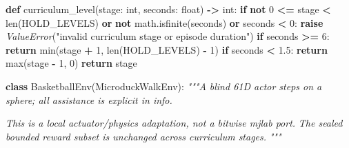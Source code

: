 \documentclass[
  american,
  11pt,
  letterpaper,
]{article}
\newenvironment{Shaded}{\begin{snugshade}}{\end{snugshade}}
\newcommand{\BuiltInTok}[1]{#1}
\newcommand{\CommentTok}[1]{\textcolor[rgb]{0.56,0.35,0.01}{\textit{#1}}}
\newcommand{\ControlFlowTok}[1]{\textcolor[rgb]{0.13,0.29,0.53}{\textbf{#1}}}
\newcommand{\DecValTok}[1]{\textcolor[rgb]{0.00,0.00,0.81}{#1}}
\newcommand{\FloatTok}[1]{\textcolor[rgb]{0.00,0.00,0.81}{#1}}
\newcommand{\KeywordTok}[1]{\textcolor[rgb]{0.13,0.29,0.53}{\textbf{#1}}}
\newcommand{\NormalTok}[1]{#1}
\newcommand{\OperatorTok}[1]{\textcolor[rgb]{0.81,0.36,0.00}{\textbf{#1}}}
\newcommand{\PreprocessorTok}[1]{\textcolor[rgb]{0.56,0.35,0.01}{\textit{#1}}}
\newcommand{\StringTok}[1]{\textcolor[rgb]{0.31,0.60,0.02}{#1}}
\renewenvironment{Shaded}{\par\smallskip}{\par\smallskip}
\begin{document}
\begin{Shaded}
\begin{Highlighting}[]
\KeywordTok{def}\NormalTok{ curriculum\_level(stage: }\BuiltInTok{int}\NormalTok{, seconds: }\BuiltInTok{float}\NormalTok{) }\OperatorTok{{-}\textgreater{}} \BuiltInTok{int}\NormalTok{:}
    \ControlFlowTok{if} \KeywordTok{not} \DecValTok{0} \OperatorTok{\textless{}=}\NormalTok{ stage }\OperatorTok{\textless{}} \BuiltInTok{len}\NormalTok{(HOLD\_LEVELS) }\KeywordTok{or} \KeywordTok{not}\NormalTok{ math.isfinite(seconds) }\KeywordTok{or}\NormalTok{ seconds }\OperatorTok{\textless{}} \DecValTok{0}\NormalTok{:}
        \ControlFlowTok{raise} \PreprocessorTok{ValueError}\NormalTok{(}\StringTok{"invalid curriculum stage or episode duration"}\NormalTok{)}
    \ControlFlowTok{if}\NormalTok{ seconds }\OperatorTok{\textgreater{}=} \DecValTok{6}\NormalTok{:}
        \ControlFlowTok{return} \BuiltInTok{min}\NormalTok{(stage }\OperatorTok{+} \DecValTok{1}\NormalTok{, }\BuiltInTok{len}\NormalTok{(HOLD\_LEVELS) }\OperatorTok{{-}} \DecValTok{1}\NormalTok{)}
    \ControlFlowTok{if}\NormalTok{ seconds }\OperatorTok{\textless{}} \FloatTok{1.5}\NormalTok{:}
        \ControlFlowTok{return} \BuiltInTok{max}\NormalTok{(stage }\OperatorTok{{-}} \DecValTok{1}\NormalTok{, }\DecValTok{0}\NormalTok{)}
    \ControlFlowTok{return}\NormalTok{ stage}


\KeywordTok{class}\NormalTok{ BasketballEnv(MicroduckWalkEnv):}
    \CommentTok{"""A blind 61D actor steps on a sphere; all assistance is explicit in info.}

\CommentTok{    This is a local actuator/physics adaptation, not a bitwise mjlab port.}
\CommentTok{    The sealed bounded reward subset is unchanged across curriculum stages.}
\CommentTok{    """}


\end{Highlighting}
\end{Shaded}
\end{document}
